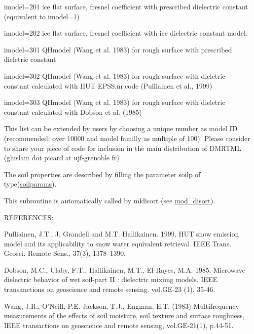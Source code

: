 \begin{DoxyItemize}
\item imodel=201 ice flat surface, fresnel coefficient with prescribed dielectric constant (equivalent to imodel=1)
\item imodel=202 ice flat surface, fresnel coefficient with ice dielectric constant model.
\end{DoxyItemize}


\begin{DoxyItemize}
\item imodel=301 QHmodel (Wang et al. 1983) for rough surface with prescribed dieletric constant
\item imodel=302 QHmodel (Wang et al. 1983) for rough surface with dieletric constant calculated with HUT EPSS.m code (Pulliainen et al., 1999)
\item imodel=303 QHmodel (Wang et al. 1983) for rough surface with dieletric constant calculated with Dobson et al. (1985)
\end{DoxyItemize}

This list can be extended by users by choosing a unique number as model ID (recommended: over 10000 and model familly as multiple of 100). Please consider to share your piece of code for inclusion in the main distribution of DMRTML (ghislain dot picard at ujf-\/grenoble fr)

The soil properties are described by filling the parameter soilp of type(\hyperlink{typemod__soil_1_1soilparams}{soilparams}).

This subroutine is automatically called by mldisort (see \hyperlink{namespacemod__disort}{mod\_\-disort}).

REFERENCES:

Pulliainen, J.T., J. Grandell and M.T. Hallikainen. 1999. HUT snow emission model and its applicability to snow water equivalent retrieval. IEEE Trans. Geosci. Remote Sens., 37(3), 1378–1390.

Dobson, M.C., Ulaby, F.T., Hallikainen, M.T., El-\/Rayes, M.A. 1985. Microwave dielectric behavior of wet soil-\/part II : dielectric miximg models. IEEE transanctions on geoscience and remote sensing. vol.GE-\/23 (1). 35-\/46.

Wang, J.R., O'Neill, P.E. Jackson, T.J., Engman, E.T. (1983) Multifrequency measurements of the effects of soil moisture, soil texture and surface roughness, IEEE transactions on geoscience and remote sensing, vol.GE-\/21(1), p.44-\/51.

